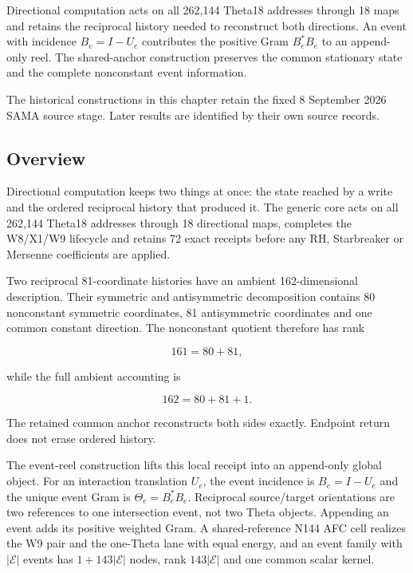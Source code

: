 \label{viii-ch06-directional-history-and-event-reels}

Directional computation acts on all 262,144 Theta18 addresses through 18 maps and retains the reciprocal history needed to reconstruct both directions. An event with incidence $B_e=I-U_e$ contributes the positive Gram $B_e^*B_e$ to an append-only reel. The shared-anchor construction preserves the common stationary state and the complete nonconstant event information.

The historical constructions in this chapter retain the fixed 8 September 2026 SAMA source stage. Later results are identified by their own source records.

\subsection{Overview}\label{viii-ch06-overview}

Directional computation keeps two things at once: the state reached by a
write and the ordered reciprocal history that produced it. The generic
core acts on all 262,144 Theta18 addresses through 18 directional maps,
completes the W8/X1/W9 lifecycle and retains 72 exact receipts before
any RH, Starbreaker or Mersenne coefficients are applied.

Two reciprocal 81-coordinate histories have an ambient 162-dimensional
description. Their symmetric and antisymmetric decomposition contains 80
nonconstant symmetric coordinates, 81 antisymmetric coordinates and one
common constant direction. The nonconstant quotient therefore has rank

\[
161=80+81,
\]

while the full ambient accounting is

\[
162=80+81+1.
\]

The retained common anchor reconstructs both sides exactly. Endpoint
return does not erase ordered history.

The event-reel construction lifts this local receipt into an append-only
global object. For an interaction translation \(U_e\), the event
incidence is \(B_e=I-U_e\) and the unique event Gram is
\(\Theta_e=B_e^*B_e\). Reciprocal source/target orientations are two
references to one intersection event, not two Theta objects. Appending
an event adds its positive weighted Gram. A shared-reference N144 AFC
cell realizes the W9 pair and the one-Theta lane with equal energy, and
an event family with \(|\mathcal E|\) events has \(1+143|\mathcal E|\)
nodes, rank \(143|\mathcal E|\) and one common scalar kernel.


